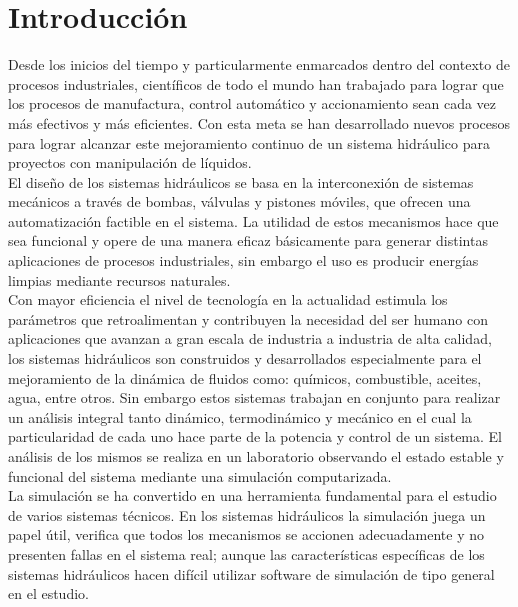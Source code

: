 \documentclass[a4paper,12pt,twoside]{proyectotanquesecci}
\begin{document}
\chapter{Introducción}

Desde los inicios del tiempo y particularmente enmarcados dentro del contexto de procesos industriales, científicos de todo el mundo han trabajado para lograr que los procesos de manufactura, control automático y accionamiento sean cada vez más efectivos y más eficientes. Con esta meta se han desarrollado nuevos procesos para lograr alcanzar este mejoramiento continuo de un sistema hidráulico para proyectos con manipulación de líquidos.\\

El diseño de los sistemas hidráulicos se basa en la interconexión de  sistemas mecánicos a través de bombas, válvulas y pistones móviles, que ofrecen una automatización factible  en el sistema. La utilidad de estos mecanismos hace que sea  funcional y  opere de una manera  eficaz básicamente para generar distintas aplicaciones de procesos industriales, sin embargo el uso es producir energías limpias mediante recursos naturales.\\

Con mayor eficiencia el nivel de tecnología en la actualidad estimula los parámetros que retroalimentan y contribuyen la necesidad del ser humano con aplicaciones que avanzan a gran escala de industria a industria de alta calidad,  los sistemas hidráulicos son construidos y desarrollados especialmente para el mejoramiento de la dinámica de fluidos como: químicos, combustible, aceites, agua, entre otros. Sin embargo estos sistemas trabajan en conjunto para realizar un análisis integral tanto dinámico, termodinámico y mecánico en el cual la particularidad de cada uno hace parte de la potencia y control de un sistema. El análisis de los mismos se realiza en un laboratorio observando el estado estable y funcional del sistema mediante una simulación computarizada.\\

La simulación se ha convertido en una herramienta fundamental para el estudio de varios sistemas técnicos. En los sistemas hidráulicos la simulación juega un papel útil, verifica que todos los mecanismos se accionen adecuadamente y no presenten fallas en el sistema real; aunque las características específicas de los sistemas hidráulicos hacen difícil utilizar software de simulación de tipo general en el estudio.\\
\end{document}
